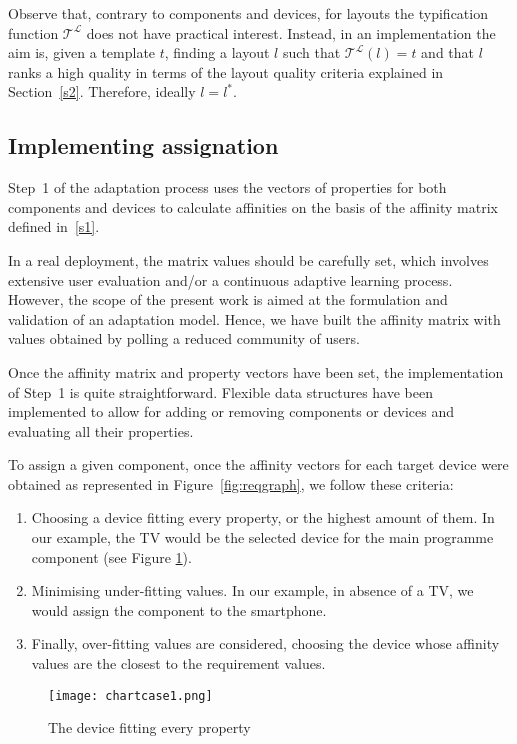 Observe that, contrary to components and devices, for layouts the typification function $\mathcal{T^L}$ does not have practical interest. 
Instead, in an implementation the aim is, given a template $t$, finding a layout $l$ such that $\mathcal{T^L}(l)=t$ and that $l$ ranks a high quality in terms of the layout quality criteria explained in Section~\ref{s2}. Therefore, ideally $l=l^*$. 


\subsection{Implementing assignation} \label{imps1}
Step~1 of the adaptation process uses the vectors of properties for both components and devices to calculate affinities on the basis of the affinity matrix defined in~\ref{s1}.

In a real deployment, the matrix values should be carefully set, which involves extensive user evaluation and/or a continuous adaptive learning process.
However, the scope of the present work is aimed at the formulation and validation of an adaptation model. Hence, we have built the affinity matrix with values obtained by polling a reduced community of users. 

Once the affinity matrix and property vectors have been set, the implementation of Step~1 is quite straightforward. 
Flexible data structures have been implemented to allow for adding or removing components or devices and evaluating all their properties. 

To assign a given component, once the affinity vectors for each target device were obtained as represented in Figure~\ref{fig:reqgraph}, we follow these criteria:
\begin{enumerate}
	\item Choosing a device fitting every property, or the highest amount of them. In our example, the TV would be the selected device for the main programme component (see Figure \ref{fig:chartcase1}).
	\item  Minimising under-fitting values. In our example, in absence of a TV, we would assign the component to the smartphone.
	\item Finally, over-fitting values are considered, choosing the device whose affinity values are the closest to the requirement values.
\end{enumerate}

\begin{figure}
	\begin{center}
		\texttt{[image: chartcase1.png]}
		\caption{The device fitting every property}
		\label{fig:chartcase1}
	\end{center}
\end{figure}

